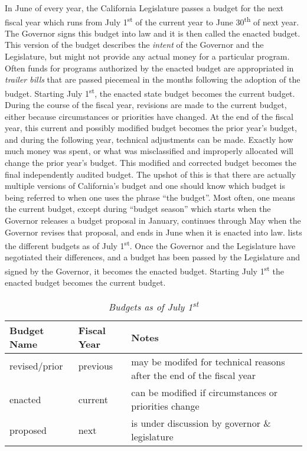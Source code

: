 In June of every year, the California Legislature passes a budget for the next fiscal year which runs from July 1\textsuperscript{st} of the current year to June 30\textsuperscript{th} of next year. The Governor signs this budget into law and it is then called the enacted budget. This version of the budget describes the \textit{intent} of the Governor and the Legislature, but might not provide any actual money for a particular program. Often funds for programs authorized by the enacted budget are appropriated in \textit{trailer bills} that are passed piecemeal in the months following the adoption of the budget. Starting July 1\textsuperscript{st}, the enacted state budget becomes the current budget. During the course of the fiscal year, revisions are made to the current budget, either because circumstances or priorities have changed. At the end of the fiscal year, this current and possibly modified budget becomes the prior year's budget, and during the following year, technical adjustments can be made. Exactly how much money was spent, or what was misclassified and improperly allocated will change the prior year's budget. This modified and corrected budget becomes the final independently audited budget. The upshot of this is that there are actually multiple versions of California's budget and one should know which budget is being referred to when one uses the phrase ``the budget''. Most often, one means the current budget, except during ``budget season'' which starts when the Governor releases a budget proposal in January, continues through May when the Governor revises that proposal, and ends in June when it is enacted into law.  lists the different budgets as of July 1\textsuperscript{st}. Once the Governor and the Legislature have negotiated their differences, and a budget has been passed by the Legislature and signed by the Governor, it becomes the enacted budget. Starting July 1\textsuperscript{st} the enacted budget becomes the current budget.

\begin{table}[ht]
  \OnehalfSpacing%
  \caption[Budgets as of July 1\textsuperscript{st}]{\textit{Budgets as of July 1\textsuperscript{st}}}%
  \label{tab:july_1_budgets}%
  \begin{tabularx}{\linewidth}{lll}
    \toprule
    \textbf{Budget Name} & \textbf{Fiscal Year} & \textbf{Notes}\\
    \midrule
      revised/prior  & previous & \multirow[t]{2}{4in}{may be modifed for technical reasons after the end of the fiscal year}\\\vspace{1ex}\\
      enacted  & current  & can be modified if circumstances or priorities change\vspace{1ex}\\
      proposed & next     & is under discussion by governor \& legislature\\
  \bottomrule
\end{tabularx}
\end{table}

